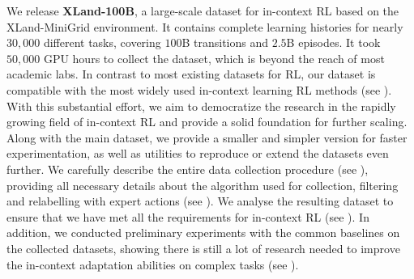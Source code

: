 \documentclass{article}
\begin{document}
We release \textbf{XLand-100B}, a large-scale dataset for in-context RL based on the XLand-MiniGrid \citep{nikulin2023xland} environment. It contains complete learning histories for nearly $30,000$ different tasks, covering $100$B transitions and $2.5$B episodes. It took $50,000$ GPU hours to collect the dataset, which is beyond the reach of most academic labs. In contrast to most existing datasets for RL, our dataset is compatible with the most widely used in-context learning RL methods (see ). With this substantial effort, we aim to democratize the research in the rapidly growing field of in-context RL and provide a solid foundation for further scaling.
Along with the main dataset, we provide a smaller and simpler version for faster experimentation, as well as utilities to reproduce or extend the datasets even further. We carefully describe the entire data collection procedure (see ), providing all necessary details about the algorithm used for collection, filtering and relabelling with expert actions (see ). We analyse the resulting dataset to ensure that we have met all the requirements for in-context RL (see ). In addition, we conducted preliminary experiments with the common baselines on the collected datasets, showing there is still a lot of research needed to improve the in-context adaptation abilities on complex tasks (see ).
\end{document}

